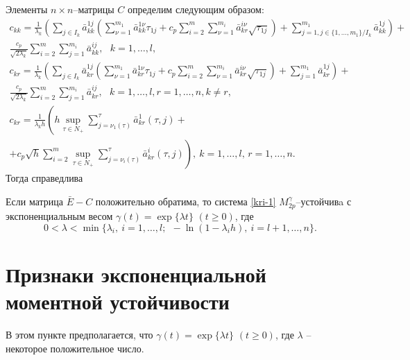Элементы $n\times n$--матрицы $C$ определим следующим образом:
$$
\begin{array}{crl}
c_{kk}  = \frac{1}{\lambda _k }\left(\sum \limits_{j \in I_k}\bar
a^{1j}_{kk}\left(\sum \limits_{\nu=1}^{m_1}\bar a^{1\nu}_{kk}\tau
_{1j}  + c_p\sum \limits_{i=2}^m \sum \limits_{\nu=1}^{m_i}\bar
a^{i\nu}_{kr}\sqrt{\tau _{1j}}\right) + \sum \limits_{j=1, j \in
\{1,\dots,m_1\}/ I_k}^{m_1} \bar a^{1j}_{kk}\right)+ \\
\frac{c_p}{\sqrt{2\lambda_k }}\sum
\limits_{i=2}^m \sum \limits_{j=1}^{m_i}\bar a^{ij}_{kk}, \ \ \ k = 1,\dots,l,\\
c_{kr} = \frac{1}{\lambda _k }\left(\sum \limits_{j \in I_k}\bar
a^{1j}_{kr}\left(\sum \limits_{\nu=1}^{m_1}\bar a^{1\nu}_{kr} \tau
_{1j} +  c_p\sum \limits_{i=2}^m \sum \limits_{\nu=1}^{m_i}\bar
a^{i\nu}_{kr}\sqrt{\tau _{1j}}\right) + \sum \limits_{j=1}^{m_1}
\bar a^{1j}_{kr}\right)+ \\
\frac{c_p}{\sqrt{2\lambda_k }}\sum \limits_{i=2}^m \sum
\limits_{j=1}^{m_i}\bar a^{ij}_{kr}, \ \ \ k =
1,\dots,l,r = 1, \dots, n, k \neq r,\\
 c_{kr} = \frac{1}{\lambda_kh}
\left(h\mathrel {\mathop {\sup} \limits _{\tau \in N_+}}\sum \limits
_{j=\nu _1 (\tau)}^{\tau}\bar a^{1}_{kr}(\tau,j) +
\right. \\ \left. +
c_p\sqrt{h}\sum
\limits _{i=2}^{m}\mathrel {\mathop {\sup} \limits _{\tau \in
N_+}}\sum \limits _{j=\nu _i (\tau)}^{\tau}\bar
a^{i}_{kr}(\tau,j)\right), \ k = 1,\dots,l,\, r  = 1,\dots,n.
\end{array}
$$
Тогда справедлива

\begin{theorem}\label{kri-th5}
Если матрица $\bar E - C$ положительно
обратима, то система \eqref{kri-1} $M_{2p}^\gamma $--устой\-чи\-вa с
экспоненциальным весом $\gamma (t) = \exp \{\lambda t\} \,\, (t \geq
0)$, где \begin{equation}\label{kri-9}0<\lambda < \min \{\lambda _i, \ i = 1, \dots,l; \ \ -\ln
(1-\lambda _ih), \ i = l+1, \dots, n \}.
\end{equation}
\end{theorem}

\section{Признаки экспоненциальной моментной устойчивости}\label{kri-s4}
В этом пункте предполагается, что $\gamma (t) = \exp \{\lambda t\}
\,\, (t \geq 0)$, где $\lambda$ --  некоторое  положительное число.

